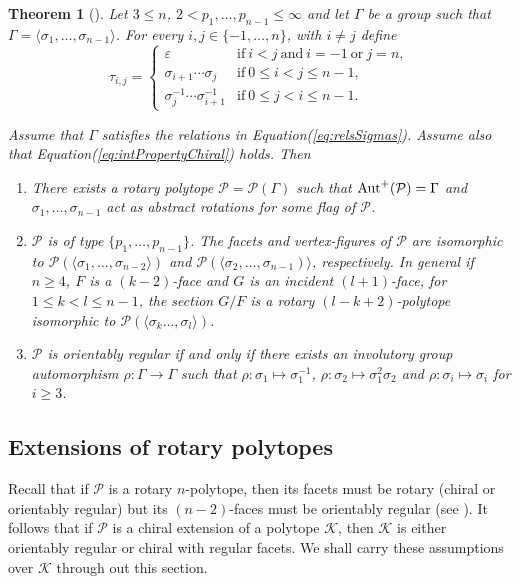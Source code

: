 \documentclass[final]{amsart}
\theoremstyle{plain}
\newtheorem{thm}{Theorem}[section]
\theoremstyle{definition}
\theoremstyle{remark}
\numberwithin{equation}{section}
\renewcommand{\leq}{\leqslant} \renewcommand{\geq}{\geqslant}
\renewcommand{\{}{\lbrace}
\renewcommand{\}}{\rbrace}
\newcommand{\cK}{\mathcal{K}}
\newcommand{\cP}{\mathcal{P}}
\newcommand{\id}{\varepsilon}
\begin{document}
\begin{thm}[{\cite[Theorem 1]{SchulteWeiss_1991_ChiralPolytopes}}]\label{thm:chiralGroups}
Let $3\leq n$, $2 < p_{1}, \dots, p_{n-1} \leq \infty$ and let $\Gamma$ be a group such that $\Gamma=\langle \sigma_{1}, \dots, \sigma_{n-1} \rangle$. For every $i,j \in \{-1, \dots, n\}$, with $i \neq j$ define
\[\tau_{i,j}=
\begin{cases}
	\id & \text{if}\ i<j\ \text{and}\ i=-1\ \text{or}\ j=n,\\ 
  \sigma_{i+1} \cdots \sigma_{j} & \text{if}\ 0\leq i<j\leq n-1, \\
  \sigma^{-1}_{j} \cdots \sigma^{-1}_{i+1} & \text{if}\ 0\leq j<i\leq n-1. 
\end{cases}
\]

Assume that $\Gamma$ satisfies the relations in  Equation\nobreakspace \textup {(\ref {eq:relsSigmas})}. Assume also that Equation\nobreakspace \textup {(\ref {eq:intPropertyChiral})} holds. Then
\begin{enumerate}
  \item\label{part:existence} There exists a rotary polytope $\cP=\cP(\Gamma)$ such that $\autp(\cP)=\Gamma$ and $\sigma_{1}, \dots, \sigma_{n-1}$ act as abstract rotations for some flag of $\cP$.
  \item\label{part:facets} $\cP$ is of type $\{p_{1}, \dots, p_{n-1}\}$. The facets and vertex-figures of $\cP$ are isomorphic to $\cP(\langle\sigma_{1}, \dots, \sigma_{n-2}\rangle)$ and $\cP(\langle \sigma_{2}, \dots, \sigma_{n-1})\rangle$, respectively. In general if $n \geq 4$, $F$ is a $(k-2)$-face and $G$ is an incident $(l+1)$-face, for  $1 \leq k < l \leq n-1$,  the section $G/F$ is a rotary $(l-k+2)$-polytope isomorphic to $\cP(\langle \sigma_{k} \dots, \sigma_{l} \rangle)$. 
  \item\label{part:chirality} $\cP$ is orientably regular if and only if there exists an involutory group automorphism $\rho:\Gamma \to \Gamma$ such that $\rho: \sigma_{1} \mapsto \sigma^{-1}_{1}$, $\rho: \sigma_{2} \mapsto \sigma_{1}^{2}\sigma_{2}$ and $\rho: \sigma_{i}\mapsto \sigma_{i}$ for $i\geq 3$.
\end{enumerate}
\end{thm}



\subsection{Extensions of rotary polytopes}
Recall that if $\cP$ is a rotary $n$-polytope, then its facets must be rotary (chiral or orientably regular) but its $(n-2)$-faces must be orientably regular (see \cite[Proposition 9]{SchulteWeiss_1991_ChiralPolytopes}).
It follows that if $\cP$ is a chiral extension of a polytope $\cK$, then $\cK$ is either orientably regular or chiral with regular facets. 
We shall carry these assumptions over $\cK$ through out this section.
\end{document}
